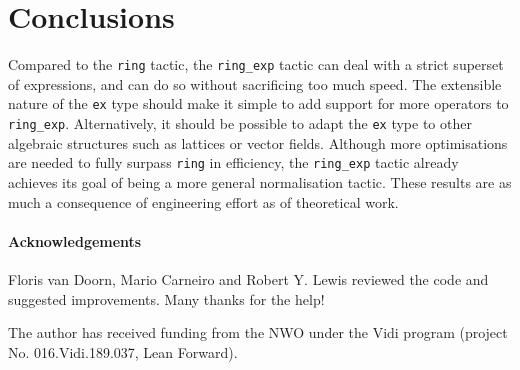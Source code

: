 \documentclass{llncs}
\newcommand{\lean}[1]{\texttt{#1}\xspace} %
\newcommand{\ex}{\lean{ex}}
\newcommand{\ring}{\lean{ring}}
\newcommand{\ringexp}{\lean{ring\_exp}}
\begin{document}
\section{Conclusions}
Compared to the \ring tactic, the \ringexp tactic can deal with a strict superset of expressions,
and can do so without sacrificing too much speed.
The extensible nature of the \ex type should make it simple to add support for more operators to \ringexp.
Alternatively, it should be possible to adapt the \ex type to other algebraic structures
such as lattices or vector fields.
Although more optimisations are needed to fully surpass \ring in efficiency,
the \ringexp tactic already achieves its goal of being a more general normalisation tactic.
These results are as much a consequence of engineering effort as of theoretical work.


\paragraph{Acknowledgements}
Floris van Doorn, Mario Carneiro and Robert Y. Lewis reviewed the code and
suggested improvements. Many thanks for the help!

The author has received funding from the NWO under the Vidi program (project
No. 016.Vidi.189.037, Lean Forward).

\printbibliography
\end{document}
